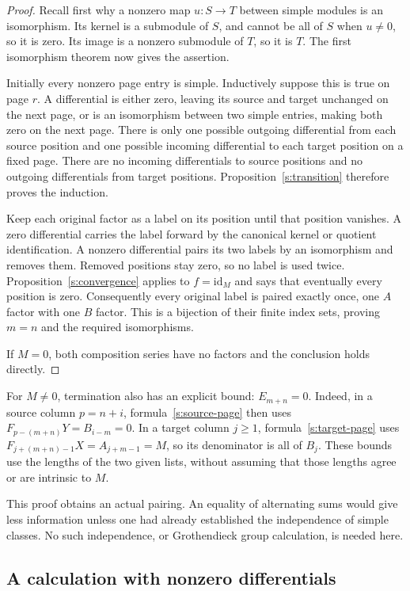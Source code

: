 \documentclass[11pt]{article}
\theoremstyle{definition}
\theoremstyle{remark}\newtheorem{remark}[theorem]{Remark}
\newcommand{\id}{\mathrm{id}}
\begin{document}
\begin{proof}
Recall first why a nonzero map $u:S\to T$ between simple modules is an
isomorphism. Its kernel is a submodule of $S$, and cannot be all of $S$
when $u\neq0$, so it is zero. Its image is a nonzero submodule of $T$,
so it is $T$. The first isomorphism theorem now gives the assertion.

Initially every nonzero page entry is simple. Inductively suppose this
is true on page $r$. A differential is either zero, leaving its source
and target unchanged on the next page, or is an isomorphism between two
simple entries, making both zero on the next page. There is only one
possible outgoing differential from each source position and one
possible incoming differential to each target position on a fixed page.
There are no incoming differentials to source positions and no outgoing
differentials from target positions. Proposition~\ref{s:transition}
therefore proves the induction.

Keep each original factor as a label on its position until that position
vanishes. A zero differential carries the label forward by the canonical
kernel or quotient identification. A nonzero differential pairs its two
labels by an isomorphism and removes them. Removed positions stay zero,
so no label is used twice. Proposition~\ref{s:convergence} applies to
$f=\id_M$ and says that eventually every position is zero. Consequently
every original label is paired exactly once, one $A$ factor with one
$B$ factor. This is a bijection of their finite index sets, proving
$m=n$ and the required isomorphisms.

If $M=0$, both composition series have no factors and the conclusion
holds directly.
\end{proof}

For $M\ne0$, termination also has an explicit bound: $E_{m+n}=0$.
Indeed, in a source column $p=n+i$, formula~\eqref{s:source-page}
then uses $F_{p-(m+n)}Y=B_{i-m}=0$. In a target column $j\geq1$,
formula~\eqref{s:target-page} uses
$F_{j+(m+n)-1}X=A_{j+m-1}=M$, so its denominator is all of $B_j$.
These bounds use the lengths of the two given lists, without assuming
that those lengths agree or are intrinsic to $M$.

This proof obtains an actual pairing. An equality of alternating sums
would give less information unless one had already established the
independence of simple classes. No such independence, or Grothendieck
group calculation, is needed here.

\subsection{A calculation with nonzero differentials}
\end{document}
